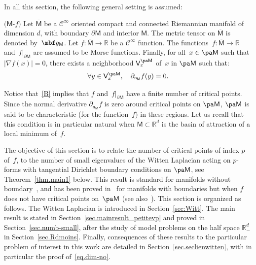 In all this section, the following general setting is assumed:
\begin{manualassumption}{$(\mathsf M$-$f)$}\label{B}
Let $\overline{\mathsf M}$ be a $\mathcal C^{\infty}$ oriented compact
and connected Riemannian manifold of dimension $d$, with boundary
$\partial \mathsf M$ and interior $\mathsf M$. The metric tensor on
$\overline{\mathsf M}$ is denoted by~$\mbf g_{\mathsf M}$. Let $f:
\overline{\mathsf M} \to \mathbb R$ be a $\mathcal C^{\infty}$
function. The functions~$f: \overline{\mathsf M} \to \mathbb R$
and~$f|_{\partial \mathsf M}$ are assumed to be Morse functions. Finally, for all~$x\in \pa \mathsf M$ such that $\vert \nabla f(x)\vert =0$, there exists a neighborhood $\mathsf V_x^{\pa \mathsf M}$ of~$x$ in $\pa \mathsf M$ such that:\vspace*{-3pt}
\[
\forall y\in \mathsf V_x^{\pa \mathsf M}, \quad \partial_{\mathsf n_{ \mathsf M}}f(y)=0.
\]
\end{manualassumption}

Notice that~\ref{B} implies that $f$ and~$f|_{\partial \mathsf M}$ have a finite number of
critical points. Since the normal derivative $\partial_{\mathsf n_{ \mathsf M}}f$ is zero around critical
points on $\pa \mathsf M$, $\pa \mathsf M$ is said
to be characteristic (for the function~$f$) in these regions. Let us
recall that this condition is in particular natural when $\mathsf M\subset \mathbb R^d$ is the basin of attraction of a local minimum of~$f$.

The objective of this section is to relate the number of critical
points of index $p$ of~$f$, to the number of small
eigenvalues of the Witten Laplacian acting on $p$-forms with
tangential Dirichlet boundary conditions on $\pa \mathsf M$, see
Theorem~\ref{thm.main1} below. This result is standard for manifolds
without
boundary~\cite{witten-82,helffer-sjostrand-85,simon1983semiclassical,herau-hitrick-sjostrand-11},
and has been proved in~\cite[Th.\,3.2.3]{helffer-nier-06} for manifolds with
boundaries but when $f$ does not have critical points on~$\pa \mathsf M$ (see
also~\cite{laudenbach2011morse,le-peutrec-10}). This section is organized
as follows. The Witten Laplacian is introduced in
Section~\ref{sec:Witt}. The main result is stated in
Section~\ref{sec.mainresult_petitevp} and proved in
Section~\ref{sec.numb-small}, after the study of model problems on the
half space $\mathbb R^d_-$ in Section~\ref{sec.Rdmoins}. Finally, consequences of these results
to the particular problem of interest in this work are detailed in
Section~\ref{sec.seclienwitten}, with in particular the proof of~\eqref{eq.dim-no}.

